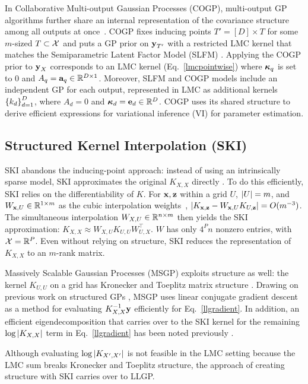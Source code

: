 \documentclass[twoside]{article}
\begin{document}
In Collaborative Multi-output Gaussian Processes (COGP), multi-output GP algorithms further share an internal representation of the covariance structure among all outputs at once~\citep{nguyen2014collaborative}. COGP fixes inducing points ${T'}=[D]\times T$ for some $m$-sized $T\subset \mathcal{X}$ and puts a GP prior on $\textbf{y}_{{T'}}$ with a restricted LMC kernel that matches the Semiparametric Latent Factor Model (SLFM) \citep{seeger2005semiparametric}. Applying the COGP prior to $\textbf{y}_X$ corresponds to an LMC kernel (Eq.~\ref{lmcpointwise}) where ${\boldsymbol\kappa}_q$ is set to 0 and $A_q=\textbf{a}_q\in\mathbb{R}^{D\times 1}$. Moreover, SLFM and COGP models include an independent GP for each output, represented in LMC as additional kernels $\left\{ k_d \right\}_{ d=1 }^{ D }$, where $A_d=0$ and ${\boldsymbol\kappa}_d=\textbf{e}_d\in\mathbb{R}^D$. COGP uses its shared structure to derive efficient expressions for variational inference (VI) for parameter estimation.

\subsection{Structured Kernel Interpolation (SKI)}\label{ski-section}

SKI abandons the inducing-point approach: instead of using an intrinsically sparse model, SKI approximates the original $K_{X,X}$ directly \citep{kiss-gp}. To do this efficiently, SKI relies on the differentiability of $K$. For $\textbf{x},\textbf{z}$ within a grid $U$, $\left\vert{U}\right\vert=m$, and $W_{\textbf{x},U}\in\mathbb{R}^{1\times m}$ as the cubic interpolation weights~\citep{keys1981cubic}, $\left|K_{\textbf{x},\textbf{z}}-W_{\textbf{x},U}K_{U,\textbf{z}}\right|=O(m^{-3})$. The simultaneous interpolation $W_{X,U}\in\mathbb{R}^{n\times m}$ then yields the SKI approximation: $K_{X,X}\approx W_{X,U}K_{U,U}W_{U,X}^\top$. $W$ has only $4^Pn$ nonzero entries, with $\mathcal{X}=\mathbb{R}^P$. Even without relying on structure, SKI reduces the representation of $K_{X,X}$ to an $m$-rank matrix.

Massively Scalable Gaussian Processes (MSGP) exploits structure as well: the kernel $K_{U,U}$ on a grid has Kronecker and Toeplitz matrix structure \citep{msgp}. Drawing on previous work on structured GPs \citep{cunningham2008fast, gilboa2015scaling}, MSGP uses linear conjugate gradient descent as a method for evaluating $K_{X,X}^{-1}\textbf{y}$ efficiently for Eq.~\ref{llgradient}. In addition, an efficient eigendecomposition that carries over to the SKI kernel for the remaining $\log\left|K_{X,X}\right|$ term in Eq.~\ref{llgradient} has been noted previously \citep{wilson2014fast}.

Although evaluating $\log\left|K_{X',X'}\right|$ is not feasible in the LMC setting because the LMC sum breaks Kronecker and Toeplitz structure, the approach of creating structure with SKI carries over to LLGP.
\end{document}
